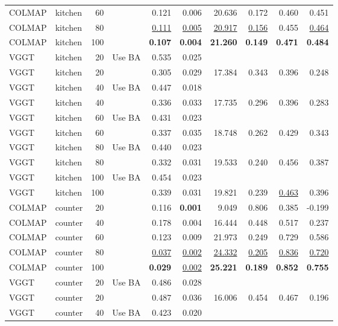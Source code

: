 \begin{table}[H]
\begin{tabular}{llrlrrrrrr}
COLMAP & kitchen & 60 &  & 0.121 & 0.006 & 20.636 & 0.172 & 0.460 & 0.451 \\
COLMAP & kitchen & 80 &  & \underline{0.111} & \underline{0.005} & \underline{20.917} & \underline{0.156} & 0.455 & \underline{0.464} \\
COLMAP & kitchen & 100 &  & \textbf{0.107} & \textbf{0.004} & \textbf{21.260} & \textbf{0.149} & \textbf{0.471} & \textbf{0.484} \\
VGGT & kitchen & 20 & Use BA & 0.535 & 0.025 &  &  &  &  \\
VGGT & kitchen & 20 &  & 0.305 & 0.029 & 17.384 & 0.343 & 0.396 & 0.248 \\
VGGT & kitchen & 40 & Use BA & 0.447 & 0.018 &  &  &  &  \\
VGGT & kitchen & 40 &  & 0.336 & 0.033 & 17.735 & 0.296 & 0.396 & 0.283 \\
VGGT & kitchen & 60 & Use BA & 0.431 & 0.023 &  &  &  &  \\
VGGT & kitchen & 60 &  & 0.337 & 0.035 & 18.748 & 0.262 & 0.429 & 0.343 \\
VGGT & kitchen & 80 & Use BA & 0.440 & 0.023 &  &  &  &  \\
VGGT & kitchen & 80 &  & 0.332 & 0.031 & 19.533 & 0.240 & 0.456 & 0.387 \\
VGGT & kitchen & 100 & Use BA & 0.454 & 0.023 &  &  &  &  \\
VGGT & kitchen & 100 &  & 0.339 & 0.031 & 19.821 & 0.239 & \underline{0.463} & 0.396 \\
\midrule
COLMAP & counter & 20 &  & 0.116 & \textbf{0.001} & 9.049 & 0.806 & 0.385 & -0.199 \\
COLMAP & counter & 40 &  & 0.178 & 0.004 & 16.444 & 0.448 & 0.517 & 0.237 \\
COLMAP & counter & 60 &  & 0.123 & 0.009 & 21.973 & 0.249 & 0.729 & 0.586 \\
COLMAP & counter & 80 &  & \underline{0.037} & \underline{0.002} & \underline{24.332} & \underline{0.205} & \underline{0.836} & \underline{0.720} \\
COLMAP & counter & 100 &  & \textbf{0.029} & \underline{0.002} & \textbf{25.221} & \textbf{0.189} & \textbf{0.852} & \textbf{0.755} \\
VGGT & counter & 20 & Use BA & 0.486 & 0.028 &  &  &  &  \\
VGGT & counter & 20 &  & 0.487 & 0.036 & 16.006 & 0.454 & 0.467 & 0.196 \\
VGGT & counter & 40 & Use BA & 0.423 & 0.020 &  &  &  &  \\

\end{tabular}
\end{table}
